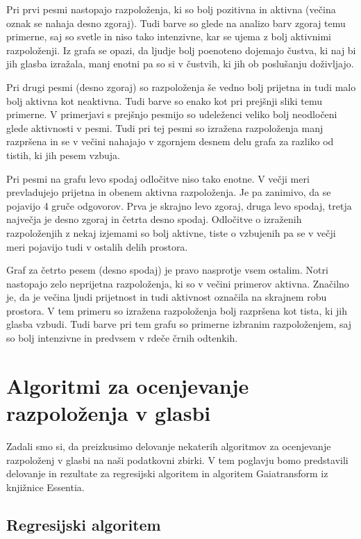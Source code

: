 \documentclass[a4paper, 12pt]{book}
\begin{document}
{Pri prvi pesmi nastopajo razpoloženja, ki so bolj pozitivna in aktivna (večina oznak se nahaja desno zgoraj). Tudi barve so glede na analizo barv zgoraj temu primerne, saj so svetle in niso tako intenzivne, kar se ujema z bolj aktivnimi razpoloženji. Iz grafa se opazi, da ljudje bolj poenoteno dojemajo čustva, ki naj bi jih glasba izražala, manj enotni pa so si v čustvih, ki jih ob poslušanju doživljajo. 

Pri drugi pesmi (desno zgoraj) so razpoloženja še vedno bolj prijetna in tudi malo bolj aktivna kot neaktivna. Tudi barve so enako kot pri prejšnji sliki temu primerne. V primerjavi s prejšnjo pesmijo so udeleženci veliko bolj neodločeni glede aktivnosti v pesmi. Tudi pri tej pesmi so izražena razpoloženja manj razpršena in se v večini nahajajo v zgornjem desnem delu grafa za razliko od tistih, ki jih pesem vzbuja. 

Pri pesmi na grafu levo spodaj odločitve niso tako enotne. V večji meri prevladujejo prijetna in obenem aktivna razpoloženja. Je pa zanimivo, da se pojavijo 4 gruče odgovorov. Prva je skrajno levo zgoraj, druga levo spodaj, tretja največja je desno zgoraj in četrta desno spodaj. Odločitve o izraženih razpoloženjih z nekaj izjemami so bolj aktivne, tiste o vzbujenih pa se v večji meri pojavijo tudi v ostalih delih prostora. 

Graf za četrto pesem (desno spodaj) je pravo nasprotje vsem ostalim. Notri nastopajo zelo neprijetna razpoloženja, ki so v večini primerov aktivna. Značilno je, da je večina ljudi prijetnost in tudi aktivnost označila na skrajnem robu prostora. V tem primeru so izražena razpoloženja bolj razpršena kot tista, ki jih glasba vzbudi. Tudi barve pri tem grafu so primerne izbranim razpoloženjem, saj so bolj intenzivne in predvsem v rdeče črnih odtenkih. 


\chapter{Algoritmi za ocenjevanje razpoloženja v glasbi}

Zadali smo si, da preizkusimo delovanje nekaterih algoritmov za ocenjevanje razpoloženj v glasbi na naši podatkovni zbirki. V tem poglavju bomo predstavili delovanje in rezultate za regresijski algoritem in algoritem Gaiatransform iz knjižnice Essentia.

\section{Regresijski algoritem}
\label{regresijsialg}

}
\end{document}
